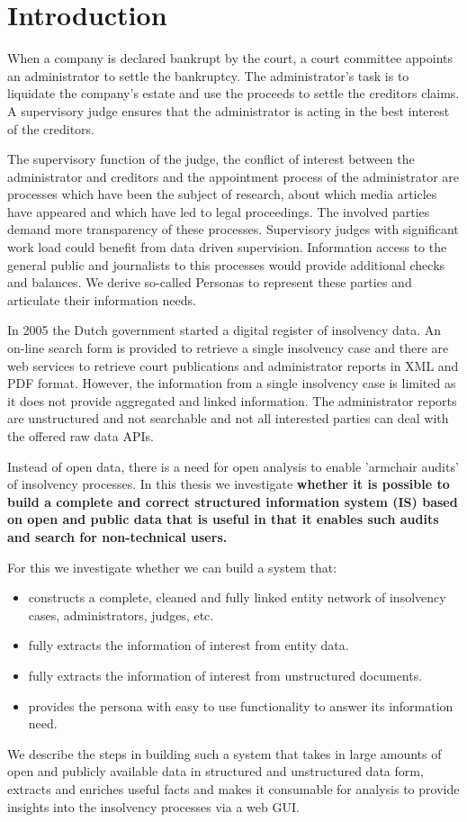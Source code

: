 \section{Introduction}
When a company is declared bankrupt by the court, a court committee appoints an administrator to settle the bankruptcy. The administrator's task is to liquidate the company's estate and use the proceeds to settle the creditors claims. A supervisory judge ensures that the administrator is acting in the best interest of the creditors. 

The supervisory function of the judge, the conflict of interest between the administrator and creditors and the appointment process of the administrator are processes which have been the subject of research\cite{boluk_2011}, about which media articles have appeared \cite{dennis_meneer_2018:1, dennis_meneer_2017:1, jan-hein_strop_2015:1} and which have led to legal proceedings.  The involved parties demand more transparency of these processes. Supervisory judges with significant work load could benefit from data driven supervision. Information access to the general public and journalists to this processes  would provide additional checks and balances. We derive so-called Personas to represent these parties and articulate their information needs.

In 2005 the Dutch government started a digital register of insolvency data\cite{rechtspraak:1}. An on-line search form \cite{rechtspraak:4} is provided to retrieve a single insolvency case and there are web services to retrieve court publications and administrator reports in XML and PDF format. However, the information from a single insolvency case is limited as it does not provide aggregated and linked information. The administrator reports are unstructured and not searchable and not all interested parties can deal with the offered raw data APIs. 

Instead of open data, there is a need for open analysis to enable 'armchair audits'\cite{o_leary_2015} of insolvency processes. In this thesis we investigate \textbf{whether it is possible to build a complete and correct structured information system (IS) based on open and public data that is useful in that it enables such audits and search for non-technical users.}

For this we investigate whether we can build a system that:
\begin{itemize}
	\item constructs a complete, cleaned and fully linked entity network of insolvency cases, administrators, judges, etc.
	\item fully extracts the information of interest from entity data.
	\item fully extracts the information of interest from unstructured documents.
	\item provides the persona with easy to use functionality to answer its information need.
\end{itemize}

We describe the steps in building such a system that takes in large amounts of open and publicly available data in structured and unstructured data form, extracts and enriches useful facts and makes it consumable for analysis to provide insights into the insolvency processes via a web GUI.

